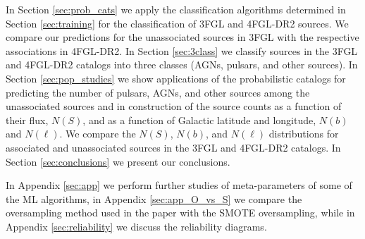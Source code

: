 In Section \ref{sec:prob_cats} we apply the classification algorithms determined in Section \ref{sec:training} for the classification of 3FGL and 4FGL-DR2 sources.
We compare our predictions for the unassociated sources in 3FGL with the respective associations in 4FGL-DR2.
In Section \ref{sec:3class} we classify sources in the 3FGL and 4FGL-DR2 catalogs into three classes (AGNs, pulsars, and other sources).
In Section \ref{sec:pop_studies} we show applications of the probabilistic catalogs for predicting the number of pulsars, AGNs, and other sources among the unassociated sources and in construction of the source counts as a function of their flux, $N(S)$, and as a function of 
Galactic latitude and longitude, $N(b)$ and $N(\ell)$.
We compare the $N(S)$, $N(b)$, and $N(\ell)$ distributions for associated and unassociated sources in the 3FGL and 4FGL-DR2 catalogs.
In Section \ref{sec:conclusions} we present our conclusions.

In Appendix \ref{sec:app} we perform further studies of meta-parameters of some of the ML algorithms, 
in Appendix \ref{sec:app_O_vs_S} we compare the oversampling method used in the paper with the SMOTE oversampling,
while in Appendix \ref{sec:reliability} we discuss the reliability diagrams.


